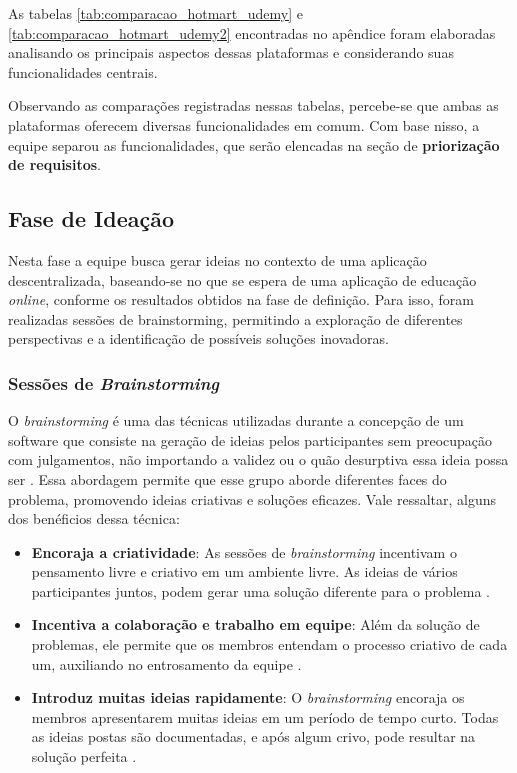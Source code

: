         As tabelas \ref{tab:comparacao_hotmart_udemy} e \ref{tab:comparacao_hotmart_udemy2} encontradas no apêndice foram elaboradas analisando os principais aspectos dessas plataformas e considerando suas funcionalidades centrais.

        Observando as comparações registradas nessas tabelas, percebe-se que ambas as plataformas oferecem diversas funcionalidades em comum. Com base nisso, a equipe separou as funcionalidades, que serão elencadas na seção de \textbf{priorização de requisitos}.

    \subsection{Fase de Ideação}
    Nesta fase a equipe busca gerar ideias no contexto de uma aplicação descentralizada, baseando-se no que se espera de uma aplicação de educação \textit{online}, conforme os resultados obtidos na fase de definição. Para isso, foram realizadas sessões de brainstorming, permitindo a exploração de diferentes perspectivas e a identificação de possíveis soluções inovadoras.

        \subsubsection{Sessões de \textit{Brainstorming}}
        \label{brainstorming}
        O \textit{brainstorming} é uma das técnicas utilizadas durante a concepção de um software que consiste na geração de ideias pelos participantes sem preocupação com julgamentos, não importando a validez ou o quão desurptiva essa ideia possa ser \cite{osborn1953}. Essa abordagem permite que esse grupo aborde diferentes faces do problema, promovendo ideias criativas e soluções eficazes. Vale ressaltar, alguns dos benéficios dessa técnica:

        \begin{itemize}
            \item \textbf{Encoraja a criatividade}: As sessões de \textit{brainstorming} incentivam o pensamento livre e criativo em um ambiente livre. As ideias de vários participantes juntos, podem gerar uma solução diferente para o problema \cite{miro2025}.
            \item \textbf{Incentiva a colaboração e trabalho em equipe}: Além da solução de problemas, ele permite que os membros entendam o processo criativo de cada um, auxiliando no entrosamento da equipe \cite{miro2025}.
            \item \textbf{Introduz muitas ideias rapidamente}: O \textit{brainstorming} encoraja os membros apresentarem muitas ideias em um período de tempo curto. Todas as ideias postas são documentadas, e após algum crivo, pode resultar na solução perfeita \cite{miro2025}.
        \end{itemize}

